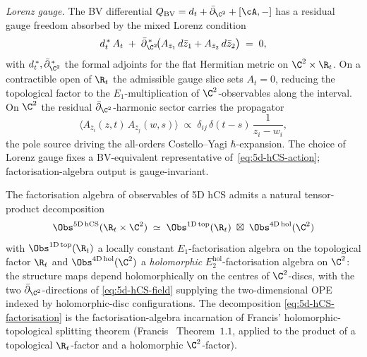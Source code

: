 \emph{Lorenz gauge.} The BV differential $Q_{\mathrm{BV}} = d_t +
\bar\partial_{\C^2} + [\cA, -]$ has a residual gauge freedom absorbed
by the mixed Lorenz condition
\begin{equation}
\label{eq:5d-hCS-lorenz-gauge}
 d_t^{\,\ast}\, A_t
 \;+\; \bar\partial_{\C^2}^{\,\ast}\!
 \bigl(A_{\bar z_1}\, d\bar z_1 + A_{\bar z_2}\, d\bar z_2\bigr)
 \;=\; 0,
\end{equation}
with $d_t^{\,\ast}, \bar\partial_{\C^2}^{\,\ast}$ the formal adjoints for
the flat Hermitian metric on $\C^2 \times \R_t$. On a contractible
open of $\R_t$ the admissible gauge slice sets $A_t = 0$, reducing the
topological factor to the $E_1$-multiplication of $\C^2$-observables
along the interval. On $\C^2$ the residual
$\bar\partial_{\C^2}$-harmonic sector carries the propagator
\begin{equation}
\label{eq:5d-hCS-propagator}
 \bigl\langle A_{\bar z_i}(z, t)\, A_{\bar z_j}(w, s)\bigr\rangle
 \;\propto\;
 \delta_{ij}\,\delta(t - s)\,\frac{1}{z_i - w_i},
\end{equation}
the pole source driving the all-orders Costello--Yagi
$\hbar$-expansion. The choice of Lorenz gauge fixes a BV-equivalent
representative of~\eqref{eq:5d-hCS-action}; factorisation-algebra
output is gauge-invariant.

The factorisation algebra of observables of 5D hCS admits a natural
tensor-product decomposition
\begin{equation}
\label{eq:5d-hCS-factorisation}
 \Obs^{\mathrm{5D\,hCS}}(\R_t \times \C^2) \;\simeq\;
 \Obs^{\mathrm{1D\,top}}(\R_t) \;\boxtimes\;
 \Obs^{\mathrm{4D\,hol}}(\C^2)
\end{equation}
with $\Obs^{\mathrm{1D\,top}}(\R_t)$ a locally constant $E_1$-factorisation
algebra on the topological factor $\R_t$ and $\Obs^{\mathrm{4D\,hol}}(\C^2)$
a \emph{holomorphic} $E_2^{\mathrm{hol}}$-factorisation algebra on
$\C^2$: the structure maps depend holomorphically on the centres of
$\C^2$-discs, with the two $\bar\partial_{\C^2}$-directions of
\eqref{eq:5d-hCS-field} supplying the two-dimensional OPE indexed by
holomorphic-disc configurations. The decomposition
\eqref{eq:5d-hCS-factorisation} is the factorisation-algebra
incarnation of Francis' holomorphic-topological splitting theorem
(Francis~\cite{Francis2013} Theorem~$1.1$, applied to the product of
a topological $\R_t$-factor and a holomorphic $\C^2$-factor).

